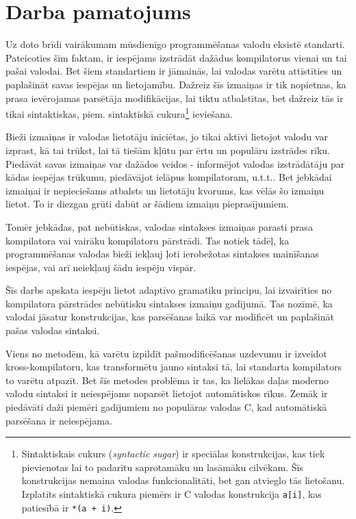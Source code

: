 \section{Darba pamatojums}

Uz doto brīdi vairākumam mūsdienīgo programmēšanas valodu eksistē standarti. Pateicoties šim faktam, ir iespējams izstrādāt dažādus kompilatorus vienai un tai pašai valodai. Bet šiem standartiem ir jāmainās, lai valodas varētu attīstīties un paplašināt savas iespējas un lietojamību. Dažreiz šīs izmaiņas ir tik nopietnas, ka prasa ievērojamas parsētāja modifikācijas, lai tiktu atbalstītas, bet dažreiz tās ir tikai sintaktiskas, piem. sintaktiskā cukura\footnote{Sintaktiskais cukurs (\emph{syntactic sugar}) ir speciālas konstrukcijas, kas tiek pievienotas lai to padarītu saprotamāku un lasāmāku cilvēkam. Šīs konstrukcijas nemaina valodas funkcionalitāti, bet gan atvieglo tās lietošanu. Izplatīts sintaktiskā cukura piemērs ir C valodas konstrukcija \texttt{a[i]}, kas patiesībā ir \texttt{*(a + i)}.} ieviešana.

Bieži izmaiņas ir valodas lietotāju iniciētas, jo tikai aktīvi lietojot valodu var izprast, kā tai trūkst, lai tā tiešām kļūtu par ērtu un populāru izstrādes rīku. Piedāvāt savas izmaiņas var dažādos veidos - informējot valodas izstrādātāju par kādas iespējas trūkumu, piedāvājot ielāpus kompilatoram, u.t.t.. Bet jebkādai izmaiņai ir nepieciešams atbalsts un lietotāju kvorums, kas vēlās šo izmaiņu lietot. To ir diezgan grūti dabūt ar šādiem izmaiņu pieprasījumiem.

Tomēr jebkādas, pat nebūtiskas, valodas sintakses izmaiņas parasti prasa kompilatora vai vairāku kompilatoru pārstrādi. Tas notiek tādēļ, ka programmēšanas valodas bieži iekļauj ļoti ierobežotas sintakses mainīšanas iespējas, vai arī neiekļauj šādu iespēju vispār. 

Šīs darbs apskata iespēju lietot adaptīvo gramatiku principu, lai izvairīties no kompilatora pārstrādes nebūtisku sintakses izmaiņu gadījumā. Tas nozīmē, ka valodai jāsatur konstrukcijas, kas parsēšanas laikā var modificēt un paplašināt pašas valodas sintaksi.

Viens no metodēm, kā varētu izpildīt pašmodificēšanas uzdevumu ir izveidot kross\--kom\-pi\-la\-to\-ru, kas transformētu jauno sintaksi tā, lai standarta kompilators to varētu atpazīt. Bet šīs metodes problēma ir tas, ka lielākas daļas moderno valodu sintaksi ir neiespējams noparsēt lietojot automātiskos rīkus. Zemāk ir piedāvāti daži piemēri gadījumiem no populāras valodas C, kad automātiskā parsēšana ir neiespējama.

